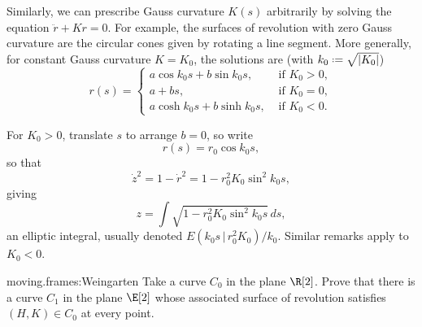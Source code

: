 \begin{example}
Similarly, we can prescribe Gauss curvature \(K(s)\) arbitrarily by solving the equation \(\ddot{r}+Kr = 0\).
For example, the surfaces of revolution with zero Gauss curvature are the circular cones given by rotating a line segment.
More generally, for constant Gauss curvature \(K=K_0\), the solutions are (with \(k_0\defeq\sqrt{\left|K_0\right|}\))
\[
r(s) = \begin{cases}
a\cos k_0s+ b\sin k_0s, & \text{ if \(K_0 > 0\)}, \\
a+bs, & \text{ if \(K_0=0\)}, \\
a\cosh k_0 s
+
b\sinh k_0 s, & \text{ if \(K_0 < 0\)}.
\end{cases}
\] 

For \(K_0>0\),  translate \(s\) to arrange \(b=0\), so write
\[
r(s)=r_0 \cos k_0 s,
\]
so that
\[
\dot{z}^2=1-\dot{r}^2=1-r_0^2K_0 \sin^2 k_0 s,
\]
giving
\[
z= \int \sqrt{1-r_0^2K_0 \sin^2 k_0 s} \, ds,
\]
an elliptic integral, usually denoted \(E(k_0s \, | \, r_0^2K_0)/k_0\).
Similar remarks apply to \(K_0<0\).
\end{example}
\begin{problem}{moving.frames:Weingarten}
Take a curve \(C_0\) in the plane \(\R[2]\).
Prove that there is a curve \(C_1\) in the plane \(\E[2]\) whose associated surface of revolution satisfies \((H,K) \in C_0\) at every point.
\end{problem}

